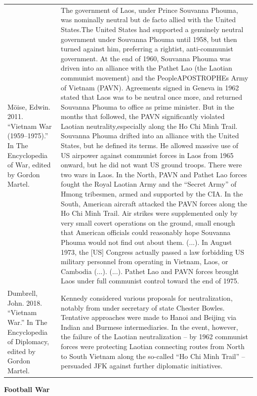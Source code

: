 {\begin{longtable}{p{}p{}}
\\
Möise, Edwin. 2011. “Vietnam War (1959–1975).” In The Encyclopedia of War, edited by Gordon Martel. & The government of Laos, under Prince Souvanna Phouma, was nominally neutral but de facto allied with the United States.The United States had supported a genuinely neutral government under Souvanna Phouma until 1958, but then turned against him, preferring a rightist, anti-communist government. At the end of 1960, Souvanna Phouma was driven into an alliance with the Pathet Lao (the Laotian communist movement) and the PeopleAPOSTROPHEs Army of Vietnam (PAVN). Agreements signed in Geneva in 1962 stated that Laos was to be neutral once more, and returned Souvanna Phouma to office as prime minister. But in the months that followed, the PAVN significantly violated Laotian neutrality,especially along the Ho Chi Minh Trail. Souvanna Phouma drifted into an alliance with the United States, but he defined its terms. He allowed massive use of US airpower against communist forces in Laos from 1965 onward, but he did not want US ground troops.
There were two wars in Laos. In the North, PAVN and Pathet Lao forces fought the Royal Laotian Army and the “Secret Army” of Hmong tribesmen, armed and supported by the CIA. In the South, American aircraft attacked the PAVN forces along the Ho Chi Minh Trail. Air strikes were supplemented only by very small covert operations on the ground, small enough that American officials could reasonably hope Souvanna Phouma would not find out about them. (...).
In August 1973, the [US] Congress actually passed a law forbidding US military personnel from operating in Vietnam, Laos, or Cambodia (...). (...).
Pathet Lao and PAVN forces brought Laos under full communist control toward the end of 1975.

\\
Dumbrell, John. 2018. “Vietnam War.” In The Encyclopedia of Diplomacy, edited by Gordon Martel. & Kennedy considered various proposals for neutralization, notably from under secretary of state Chester Bowles. Tentative approaches were made to Hanoi and Beijing via Indian and Burmese intermediaries. In the event, however, the failure of the Laotian neutralization – by 1962 communist forces were protecting Laotian connecting routes from North to South Vietnam along the so-called “Ho Chi Minh Trail” – persuaded JFK against further diplomatic initiatives.
\\
\end{longtable}}
\clearpage
         \textbf{Football War} 

